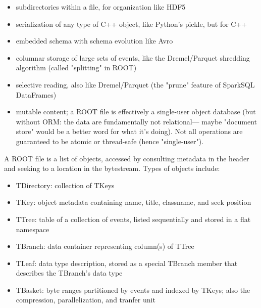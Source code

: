 \begin{itemize}

  \item subdirectories within a file, for organization like HDF5

  \item serialization of any type of C++ object, like Python's pickle, but for
  C++

  \item embedded schema with schema evolution like Avro

  \item columnar storage of large sets of events, like the Dremel/Parquet
  shredding algorithm (called "splitting" in ROOT)

  \item selective reading, also like Dremel/Parquet (the "prune" feature of
  SparkSQL DataFrames)

  \item mutable content; a ROOT file is effectively a single-user object
  database (but without ORM: the data are fundamentally not relational— maybe
  "document store" would be a better word for what it's doing). Not all
  operations are guaranteed to be atomic or thread-safe (hence "single-user").

\end{itemize}

A ROOT file is a list of objects, accessed by consulting metadata in the
header and seeking to a location in the bytestream. Types of objects include: 

\begin{itemize}

  \item TDirectory: collection of TKeys

  \item TKey: object metadata containing name, title, classname, and seek
  position

  \item TTree: table of a collection of events, listed sequentially and stored in a flat namespace

  \item TBranch: data container representing column(s) of TTree

  \item TLeaf: data type description, stored as a special TBranch member
  that describes the TBranch's data type

  \item TBasket: byte ranges partitioned by events and indexed by TKeys;
  also the compression, parallelization, and tranfer unit

\end{itemize}

